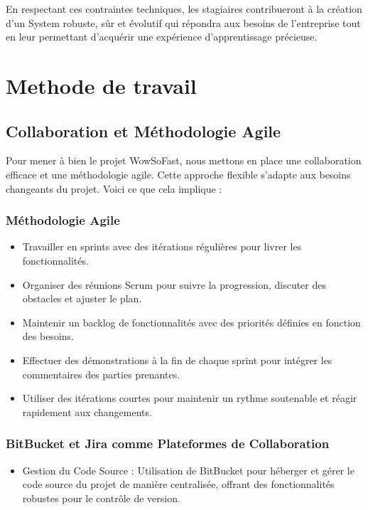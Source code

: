 {\vspace{1cm}

En respectant ces contraintes techniques, les stagiaires contribueront à la création d'un System robuste, sûr et évolutif qui répondra aux besoins de l'entreprise tout en leur permettant d'acquérir une expérience d'apprentissage précieuse.

\chapter{Methode de travail}
\section{Collaboration et Méthodologie Agile}

Pour mener à bien le projet WowSoFast, nous mettons en place une collaboration efficace et une méthodologie agile. Cette approche flexible s'adapte aux besoins changeants du projet. Voici ce que cela implique :

\subsection{Méthodologie Agile}

\begin{itemize}
  \item Travailler en sprints avec des itérations régulières pour livrer les fonctionnalités.
  \item Organiser des réunions Scrum pour suivre la progression, discuter des obstacles et ajuster le plan.
  \item Maintenir un backlog de fonctionnalités avec des priorités définies en fonction des besoins.
  \item Effectuer des démonstrations à la fin de chaque sprint pour intégrer les commentaires des parties prenantes.
  \item Utiliser des itérations courtes pour maintenir un rythme soutenable et réagir rapidement aux changements.
\end{itemize}

\subsection{BitBucket et Jira comme Plateformes de Collaboration}

\begin{itemize}
  \item Gestion du Code Source : Utilisation de BitBucket pour héberger et gérer le code source du projet de manière centralisée, offrant des fonctionnalités robustes pour le contrôle de version.
  

\end{itemize}}
